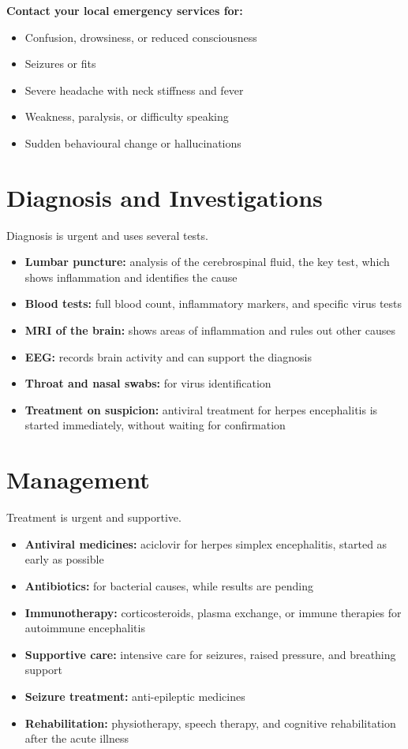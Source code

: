 \textbf{Contact your local emergency services for:}
\begin{itemize}
    \item Confusion, drowsiness, or reduced consciousness
    \item Seizures or fits
    \item Severe headache with neck stiffness and fever
    \item Weakness, paralysis, or difficulty speaking
    \item Sudden behavioural change or hallucinations
\end{itemize}

\section*{Diagnosis and Investigations}
Diagnosis is urgent and uses several tests.
\begin{itemize}
    \item \textbf{Lumbar puncture:} analysis of the cerebrospinal fluid, the key test, which shows inflammation and identifies the cause
    \item \textbf{Blood tests:} full blood count, inflammatory markers, and specific virus tests
    \item \textbf{MRI of the brain:} shows areas of inflammation and rules out other causes
    \item \textbf{EEG:} records brain activity and can support the diagnosis
    \item \textbf{Throat and nasal swabs:} for virus identification
    \item \textbf{Treatment on suspicion:} antiviral treatment for herpes encephalitis is started immediately, without waiting for confirmation
\end{itemize}

\section*{Management}
Treatment is urgent and supportive.
\begin{itemize}
    \item \textbf{Antiviral medicines:} aciclovir for herpes simplex encephalitis, started as early as possible
    \item \textbf{Antibiotics:} for bacterial causes, while results are pending
    \item \textbf{Immunotherapy:} corticosteroids, plasma exchange, or immune therapies for autoimmune encephalitis
    \item \textbf{Supportive care:} intensive care for seizures, raised pressure, and breathing support
    \item \textbf{Seizure treatment:} anti-epileptic medicines
    \item \textbf{Rehabilitation:} physiotherapy, speech therapy, and cognitive rehabilitation after the acute illness
\end{itemize}

